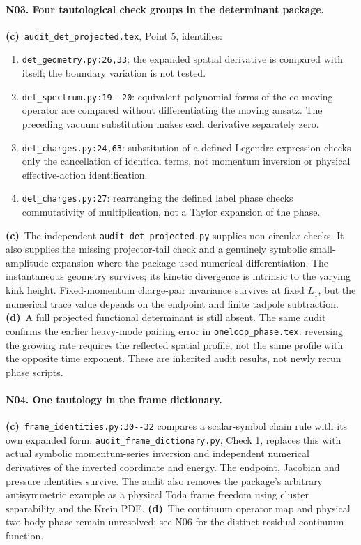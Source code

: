 \documentclass[11pt,a4paper]{article}
\newcommand{\C}{\textbf{(c)}\ }
\newcommand{\D}{\textbf{(d)}\ }
\newcommand{\file}[1]{\nolinkurl{#1}}
\begin{document}
\paragraph{N03. Four tautological check groups in the determinant package.}
\C \file{audit_det_projected.tex}, Point 5, identifies:
\begin{enumerate}[leftmargin=*]
\item \file{det_geometry.py:26,33}: the expanded spatial derivative is
compared with itself; the boundary variation is not tested.
\item \file{det_spectrum.py:19--20}: equivalent polynomial forms of the
co-moving operator are compared without differentiating the moving ansatz.
The preceding vacuum substitution makes each derivative separately zero.
\item \file{det_charges.py:24,63}: substitution of a defined Legendre
expression checks only the cancellation of identical terms, not momentum
inversion or physical effective-action identification.
\item \file{det_charges.py:27}: rearranging the defined label phase checks
commutativity of multiplication, not a Taylor expansion of the phase.
\end{enumerate}
\C The independent \file{audit_det_projected.py} supplies non-circular checks.
It also supplies the missing projector-tail check and a genuinely symbolic
small-amplitude expansion where the package used numerical differentiation.
The instantaneous geometry survives; its kinetic divergence is intrinsic to
the varying kink height. Fixed-momentum charge-pair invariance survives at
fixed $L_1$, but the numerical trace value depends on the endpoint and finite
tadpole subtraction. \D A full projected functional determinant is still absent.
The same audit confirms the earlier heavy-mode pairing error in
\file{oneloop_phase.tex}: reversing the growing rate requires the reflected
spatial profile, not the same profile with the opposite time exponent.
These are inherited audit results, not newly rerun phase scripts.

\paragraph{N04. One tautology in the frame dictionary.}
\C \file{frame_identities.py:30--32} compares a scalar-symbol chain rule
with its own expanded form. \file{audit_frame_dictionary.py}, Check 1,
replaces this with actual symbolic momentum-series inversion and independent
numerical derivatives of the inverted coordinate and energy. The endpoint,
Jacobian and pressure identities survive. The audit also removes the
package's arbitrary antisymmetric example as a physical Toda frame freedom
using cluster separability and the Krein PDE. \D The continuum operator map
and physical two-body phase remain unresolved; see N06 for the distinct
residual continuum function.
\end{document}
